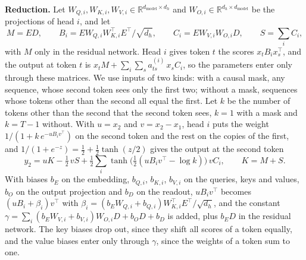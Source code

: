 \documentclass[10pt]{article}
\theoremstyle{definition}
\theoremstyle{remark}
\newcommand{\R}{\mathbb{R}}
\newcommand{\dm}{d_{\mathrm{model}}}
\newcommand{\para}[1]{\smallskip\noindent\textbf{#1}\hspace{0.5em}}
\begin{document}
\para{Reduction.} Let $W_{Q,i}, W_{K,i}, W_{V,i} \in \R^{\dm\times d_h}$ and $W_{O,i} \in \R^{d_h\times\dm}$ be the projections of head $i$, and let
\[
M = ED, \qquad B_i = EW_{Q,i}W_{K,i}^\top E^\top/\sqrt{d_h}, \qquad C_i = EW_{V,i}W_{O,i}D, \qquad S = \textstyle\sum_i C_i,
\]
with $M$ only in the residual network. Head $i$ gives token $t$ the scores $x_tB_ix_s^\top$, and the output at token $t$ is $x_tM + \sum_i\sum_s a^{(i)}_{ts}\,x_sC_i$, so the parameters enter only through these matrices. We use inputs of two kinds: with a causal mask, any sequence, whose second token sees only the first two; without a mask, sequences whose tokens other than the second all equal the first. Let $k$ be the number of tokens other than the second that the second token sees, $k = 1$ with a mask and $k = T - 1$ without. With $u = x_2$ and $v = x_2 - x_1$, head $i$ puts the weight $1/(1 + k\,e^{-uB_iv^\top})$ on the second token and the rest on the copies of the first, and $1/(1 + e^{-z}) = \tfrac12 + \tfrac12\tanh(z/2)$ gives the output at the second token
\begin{equation}\label{eq:twotok}
y_2 = uK - \tfrac12\,vS + \tfrac12\sum_i \tanh\big(\tfrac12(uB_iv^\top - \log k)\big)\,vC_i, \qquad K = M + S.
\end{equation}
With biases $b_E$ on the embedding, $b_{Q,i}$, $b_{K,i}$, $b_{V,i}$ on the queries, keys and values, $b_O$ on the output projection and $b_D$ on the readout, $uB_iv^\top$ becomes $(uB_i + \beta_i)v^\top$ with $\beta_i = (b_EW_{Q,i} + b_{Q,i})W_{K,i}^\top E^\top/\sqrt{d_h}$, and the constant $\gamma = \sum_i(b_EW_{V,i} + b_{V,i})W_{O,i}D + b_OD + b_D$ is added, plus $b_ED$ in the residual network. The key biases drop out, since they shift all scores of a token equally, and the value biases enter only through $\gamma$, since the weights of a token sum to one.
\end{document}
